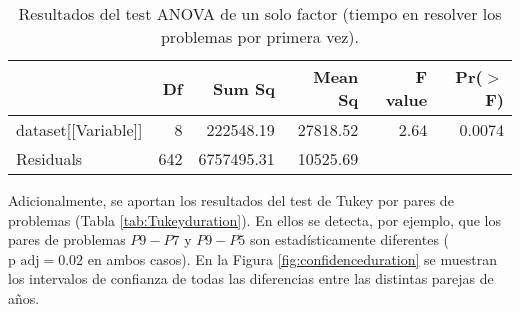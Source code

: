 \begin{table}[H]
\centering
\caption{Resultados del test ANOVA de un solo factor (tiempo en resolver los problemas por primera vez).}
\label{tab:ANOVAduration}
\begin{tabular}{lrrrrr}
  \hline
 & Df & Sum Sq & Mean Sq & F value & Pr($>$F) \\ 
  \hline
dataset[[Variable]] & 8 & 222548.19 & 27818.52 & 2.64 & 0.0074 \\ 
  Residuals           & 642 & 6757495.31 & 10525.69 &  &  \\ 
   \hline
\end{tabular}
\end{table}

Adicionalmente, se aportan los resultados del test de Tukey por pares de problemas (Tabla \ref{tab:Tukeyduration}). En ellos se detecta, por ejemplo, que los pares de problemas $P9-P7$ y $P9-P5$ son estadísticamente diferentes ($\text{p adj} = 0.02$ en ambos casos). En la Figura \ref{fig:confidenceduration} se muestran los intervalos de confianza de todas las diferencias entre las distintas parejas de años.

